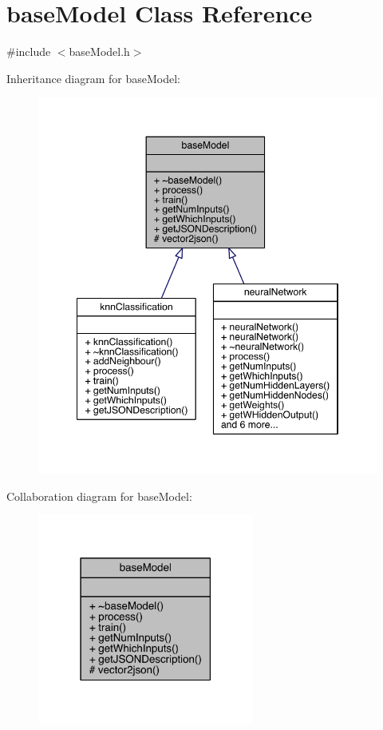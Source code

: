 \hypertarget{classbase_model}{}\section{base\+Model Class Reference}
\label{classbase_model}


{\ttfamily \#include $<$base\+Model.\+h$>$}



Inheritance diagram for base\+Model\+:
\nopagebreak
\begin{figure}[H]
\begin{center}
\leavevmode
\includegraphics[width=348pt]{classbase_model__inherit__graph}
\end{center}
\end{figure}


Collaboration diagram for base\+Model\+:
\nopagebreak
\begin{figure}[H]
\begin{center}
\leavevmode
\includegraphics[width=202pt]{classbase_model__coll__graph}
\end{center}
\end{figure}
